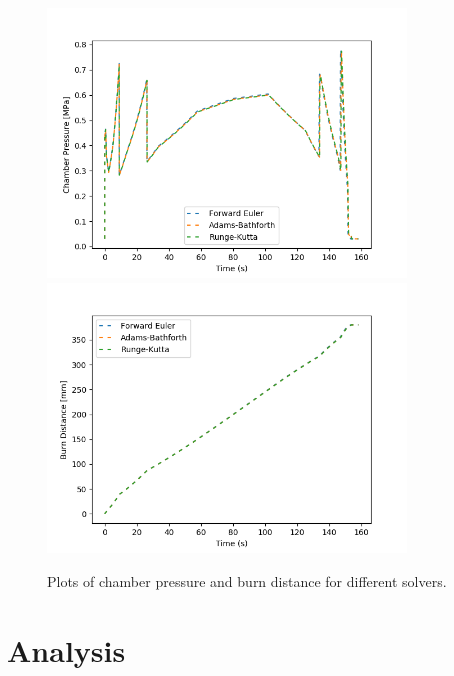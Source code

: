 \documentclass[12pt, letterpaper]{article}
\begin{document}
\begin{figure}
    \centering
    \includegraphics[width=0.85\textwidth]{chamber_pressure_compare}
    \includegraphics[width=0.85\textwidth]{burn_dist_compare}
    \caption{\label{fig:chamber_pressure_compare} Plots of chamber pressure and burn distance for different solvers.}
\end{figure}


\section{Analysis}
 
\end{document}
